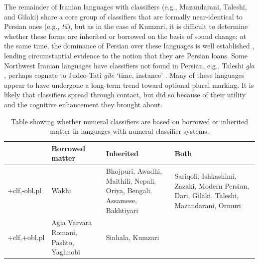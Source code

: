 \documentclass[11pt]{article}
\begin{document}
The remainder of Iranian languages with classifiers (e.g., Mazandarani, Taleshi, and Gilaki) share a core group of classifiers that are formally near-identical to Persian ones (e.g., {\it t\=a}), but as in the case of Kumzari, %
it is difficult to determine whether these forms are inherited or borrowed on the basis of sound change; 
at the same time, the dominance of Persian  over these languages is well established \citep{Borjian2009}, lending circumstantial evidence to the notion that they are Persian loans. 
Some Northwest Iranian languages have classifiers not found in Persian, e.g., Taleshi {\it g{\textschwa}la} \citep{Paul2011,Stilo2018}, perhaps cognate to Judeo-Tati {\it gile} `time, instance' \citep[310]{Authier2012}. 
Many of these languages appear to have undergone a long-term trend toward optional plural marking. It is likely that classifiers spread through contact, but did so because of their utility and the cognitive enhancement they brought about. 


 
 
\begin{table}
{\small 
 \begin{tabular}{|p{.15\linewidth}||p{.25\linewidth}|p{.25\linewidth}|p{.25\linewidth}|}
 \hline
  & Borrowed matter & Inherited & Both \\
 \hline
 +clf,-obl.pl & Wakhi & Bhojpuri, Awadhi, Maithili, Nepali, Oriya, Bengali, Assamese, Bakhtiyari & Sariqoli, Ishkashimi, Zazaki, Modern Persian, Dari, Gilaki, Taleshi, Mazandarani, Ormuri \\
\hline
+clf,+obl.pl & Agia Varvara Romani, Pashto, Yaghnobi & Sinhala, Kumzari & \\
\hline
 \end{tabular}
 }
 \caption{Table showing whether numeral classifiers are based on borrowed or inherited matter in languages with numeral classifier systems.}
 \label{counts}
 \end{table}
\end{document}
